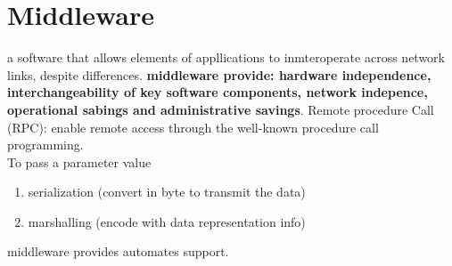 \documentclass[11pt]{article}
\begin{document}
\section{Middleware} %
\label{sec:middleware}
a software that allows elements of appllications to inmteroperate across network links, despite differences.
\textbf{middleware provide: hardware independence, interchangeability of key software components, network indepence, operational sabings and administrative savings}.
Remote procedure Call (RPC): enable remote access through the well-known procedure call programming.\\
To pass a parameter value
\begin{enumerate}
	\item serialization (convert in byte to transmit the data)
	\item marshalling (encode with data representation info)
\end{enumerate}
middleware provides automates support.
\end{document}

